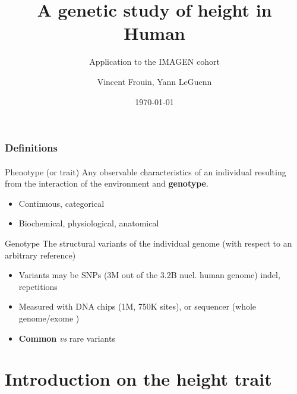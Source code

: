 \documentclass[utf8]{beamer}
\title{A genetic study of height in Human}
\subtitle{Application to the IMAGEN cohort}
\date{\today}
\author[Vincent Frouin]{Vincent Frouin, Yann LeGuenn}
\institute[CEA]{CEA - NeuroSpin}
\begin{document}
\begin{frame}
    \titlepage
\end{frame}

\begin{frame}
    \frametitle{Definitions}
    \framesubtitle{ }    
    \begin{block}{Phenotype (or trait)}
    Any observable characteristics of an individual  resulting from the interaction of the environment and \textbf{genotype}.
    \begin{itemize}
     \item Continuous, categorical
     \item Biochemical, physiological, anatomical
    \end{itemize}
    \end{block}
    
    \begin{block}{Genotype}
    The structural variants of the individual genome (with respect to an arbitrary reference)
    \begin{itemize}
    \item Variants may be SNPs (3M out of the 3.2B nucl. human genome) indel, repetitions
    \item Measured with DNA chips (1M, 750K sites), or sequencer (whole genome/exome ) 
    \item \textbf{Common} \textit{vs} rare variants
    \end{itemize}
    \end{block}
    
\end{frame}

\section{Introduction on the height trait}
\end{document}

